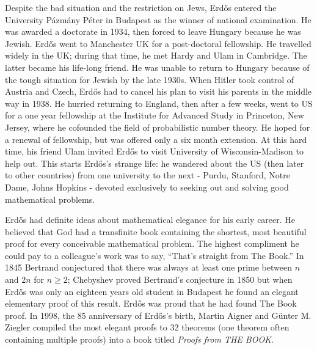 \documentclass[b5paper]{article}
\begin{document}
\begin{mdframed}
Despite the bad situation and the restriction on Jews, Erdős entered the University Pázmány Péter in Budapest as the winner of national examination. He was awarded a doctorate in 1934, then forced to leave Hungary because he was Jewish. Erdős went to Manchester UK for a post-doctoral fellowship. He travelled widely in the UK; during that time, he met Hardy and Ulam in Cambridge. The latter became his life-long friend. He was unable to return to Hungary because of the tough situation for Jewish by the late 1930s. When Hitler took control of Austria and Czech, Erdős had to cancel his plan to visit his parents in the middle way in 1938. He hurried returning to England, then after a few weeks, went to US for a one year fellowship at the Institute for Advanced Study in Princeton, New Jersey, where he cofounded the field of probabilistic number theory. He hoped for a renewal of fellowship, but was offered only a six month extension. At this hard time, his friend Ulam invited Erdős to visit University of Wisconsin-Madison to help out. This starts Erdős's strange life: he wandered about the US (then later to other countries) from one university to the next - Purdu, Stanford, Notre Dame, Johns Hopkins - devoted exclusively to seeking out and solving good mathematical problems.

Erdős had definite ideas about mathematical elegance for his early career. He believed that God had a transfinite book containing the shortest, most beautiful proof for every conceivable mathematical problem. The highest compliment he could pay to a colleague's work was to say, \enquote{That's straight from The Book.} In 1845 Bertrand conjectured that there was always at least one prime between $n$ and $2n$ for $n \geq 2$; Chebyshev proved Bertrand's conjecture in 1850 but when Erdős was only an eighteen years old student in Budapest he found an elegant elementary proof of this result. Erdős was proud that he had found The Book proof. In 1998, the 85 anniversary of Erdős's birth, Martin Aigner and Günter M. Ziegler compiled the most elegant proofs to 32 theorems (one theorem often containing multiple proofs) into a book titled \emph{Proofs from THE BOOK}.


\end{mdframed}
\end{document}
